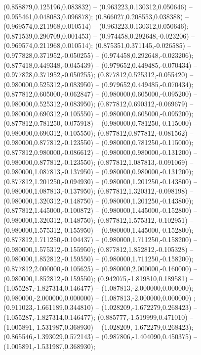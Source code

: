  (0.858879,0.125196,0.083832) -- (0.963223,0.130312,0.050646) -- (0.955461,0.048083,0.096878);
 (0.866027,0.208553,0.038388) -- (0.969574,0.211968,0.010514) -- (0.963223,0.130312,0.050646);
 (0.871539,0.290709,0.001453) -- (0.974458,0.292648,-0.023206) -- (0.969574,0.211968,0.010514);
 (0.875351,0.371145,-0.026585) -- (0.977828,0.371952,-0.050255) -- (0.974458,0.292648,-0.023206);
 (0.877418,0.449348,-0.045439) -- (0.979652,0.449485,-0.070434) -- (0.977828,0.371952,-0.050255);
 (0.877812,0.525312,-0.055420) -- (0.980000,0.525312,-0.083950) -- (0.979652,0.449485,-0.070434);
 (0.877812,0.605000,-0.062847) -- (0.980000,0.605000,-0.095200) -- (0.980000,0.525312,-0.083950);
 (0.877812,0.690312,-0.069679) -- (0.980000,0.690312,-0.105550) -- (0.980000,0.605000,-0.095200);
 (0.877812,0.781250,-0.075918) -- (0.980000,0.781250,-0.115000) -- (0.980000,0.690312,-0.105550);
 (0.877812,0.877812,-0.081562) -- (0.980000,0.877812,-0.123550) -- (0.980000,0.781250,-0.115000);
 (0.877812,0.980000,-0.086612) -- (0.980000,0.980000,-0.131200) -- (0.980000,0.877812,-0.123550);
 (0.877812,1.087813,-0.091069) -- (0.980000,1.087813,-0.137950) -- (0.980000,0.980000,-0.131200);
 (0.877812,1.201250,-0.094930) -- (0.980000,1.201250,-0.143800) -- (0.980000,1.087813,-0.137950);
 (0.877812,1.320312,-0.098198) -- (0.980000,1.320312,-0.148750) -- (0.980000,1.201250,-0.143800);
 (0.877812,1.445000,-0.100872) -- (0.980000,1.445000,-0.152800) -- (0.980000,1.320312,-0.148750);
 (0.877812,1.575312,-0.102951) -- (0.980000,1.575312,-0.155950) -- (0.980000,1.445000,-0.152800);
 (0.877812,1.711250,-0.104437) -- (0.980000,1.711250,-0.158200) -- (0.980000,1.575312,-0.155950);
 (0.877812,1.852812,-0.105328) -- (0.980000,1.852812,-0.159550) -- (0.980000,1.711250,-0.158200);
 (0.877812,2.000000,-0.105625) -- (0.980000,2.000000,-0.160000) -- (0.980000,1.852812,-0.159550);
 (0.942075,-1.819810,0.189581) -- (1.055287,-1.827314,0.146477) -- (1.087813,-2.000000,0.000000);
 (0.980000,-2.000000,0.000000) -- (1.087813,-2.000000,0.000000) ;
 (0.911023,-1.661189,0.344810) -- (1.028209,-1.672279,0.268423) -- (1.055287,-1.827314,0.146477);
 (0.885777,-1.519999,0.471010) -- (1.005891,-1.531987,0.368930) -- (1.028209,-1.672279,0.268423);
 (0.865546,-1.393029,0.572143) -- (0.987806,-1.404090,0.450375) -- (1.005891,-1.531987,0.368930);
